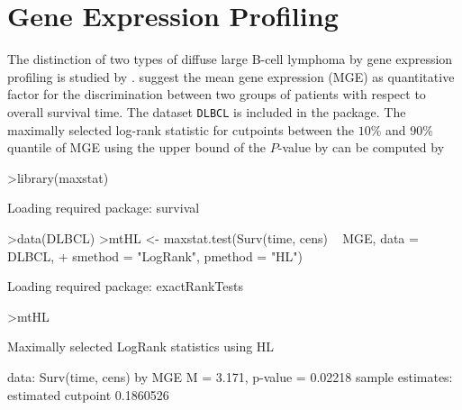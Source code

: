\documentclass{article}
\renewcommand{\baselinestretch}{1.5}
\begin{document}
\section{Gene Expression Profiling}

The distinction of two types of diffuse
large B-cell lymphoma by gene expression profiling is studied by
\cite{distinct-t:2000}. \cite{on-the-exa:2001} suggest the mean gene
expression (MGE) as quantitative factor for the discrimination between two
groups of patients with respect to overall survival time. The dataset
\texttt{DLBCL} is included in the package.
The maximally selected log-rank statistic for cutpoints between 
the $10\%$ and
$90\%$ quantile of MGE using the upper bound of the
$P$-value by \cite{on-the-exa:2001} can be computed by

\renewcommand{\baselinestretch}{1}
\begin{Schunk}
\begin{Sinput}
>library(maxstat)
\end{Sinput}
\begin{Soutput}
Loading required package: survival 
\end{Soutput}
\begin{Sinput}
>data(DLBCL)
>mtHL <- maxstat.test(Surv(time, cens) ~ MGE, data = DLBCL, 
+     smethod = "LogRank", pmethod = "HL")
\end{Sinput}
\begin{Soutput}
Loading required package: exactRankTests 
\end{Soutput}
\begin{Sinput}
>mtHL
\end{Sinput}
\begin{Soutput}
	Maximally selected LogRank statistics using HL

data:  Surv(time, cens) by MGE 
M = 3.171, p-value = 0.02218
sample estimates:
estimated cutpoint 
         0.1860526 
\end{Soutput}
\end{Schunk}
\renewcommand{\baselinestretch}{1.5}
\end{document}
